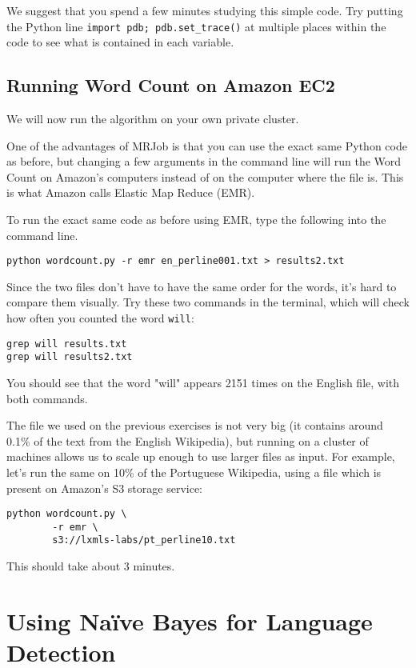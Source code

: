 We suggest that you spend a few minutes studying this simple code. Try putting the Python line \texttt{import pdb; pdb.set\_trace()} at multiple places within the code to see what is contained in each variable.

\subsection{Running Word Count on Amazon EC2}
We will now run the algorithm on your own private cluster.

One of the advantages of MRJob is that you can use the exact same Python code
as before, but changing a few arguments in the command line will run the Word
Count on Amazon's computers instead of on the computer where the file is. This
is what Amazon calls Elastic Map Reduce (EMR).

To run the exact same code as before using EMR, type the following into the command line.

\begin{verbatim}
python wordcount.py -r emr en_perline001.txt > results2.txt
\end{verbatim}

Since the two files don't have to have the same order for the words, it's hard to compare them visually. Try these two commands in the terminal, which will check how often you counted the word \texttt{will}:

\begin{verbatim}
grep will results.txt
grep will results2.txt
\end{verbatim}

You should see that the word "will" appears 2151 times on the English file, with both commands.

The file we used on the previous exercises is not very big (it contains around 0.1\% of the text from the English Wikipedia), but running on a cluster of machines allows us to
scale up enough to use larger files as input. For example, let's run the same on 10\% of the Portuguese Wikipedia, using a file which is present on Amazon's S3 storage service:

\begin{verbatim}
python wordcount.py \
        -r emr \
        s3://lxmls-labs/pt_perline10.txt
\end{verbatim}

This should take about 3 minutes.

\section{Using Na\"{i}ve Bayes for Language Detection}

